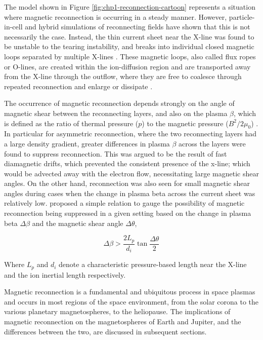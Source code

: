 The model shown in Figure \ref{fig:chp1-reconnection-cartoon} represents a situation where magnetic reconnection is occurring in a steady manner. However, particle-in-cell and hybrid simulations of reconnecting fields have shown that this is not necessarily the case. Instead, the thin current sheet near the X-line was found to be unstable to the tearing instability, and breaks into individual closed magnetic loops separated by multiple X-lines \cite{Drake2006ElectronReconnection,Drake2006FormationReconnection}. These magnetic loops, also called flux ropes or O-lines, are created within the ion-diffusion region and are transported away from the X-line through the outflow, where they are free to coalesce through repeated reconnection and enlarge or dissipate \cite{Markidis2012CollisionlessChain,Wang2016CoalescenceReconnection}. 

The occurrence of magnetic reconnection depends strongly on the angle of magnetic shear between the reconnecting layers, and also on the plasma $\beta$, which is defined as the ratio of thermal pressure ($p$) to the magnetic pressure ($B^2/2\mu_0$) \cite{Swisdak2003DiamagneticMagnetopause,Swisdak2010TheHeliosphere,Phan2010TheObservations}. In particular for asymmetric reconnection, where the two reconnecting layers had a large density gradient, greater differences in plasma $\beta$ across the layers were found to suppress reconnection. This was argued to be the result of fast diamagnetic drifts, which prevented the consistent presence of the x-line; which would be advected away with the electron flow, necessitating large magnetic shear angles. On the other hand, reconnection was also seen for small magnetic shear angles during cases when the change in plasma beta across the current sheet was relatively low.  proposed a simple relation to gauge the possibility of magnetic reconnection being suppressed in a given setting based on the change in plasma beta $\Delta \beta$ and the magnetic shear angle $\Delta \theta$,

\begin{equation}
    \Delta \beta > \frac{2 L_p}{d_i} \tan\frac{\Delta\theta}{2}
\end{equation}

Where $L_p$ and $d_i$ denote a characteristic pressure-based length near the X-line and the ion inertial length respectively. 

Magnetic reconnection is a fundamental and ubiquitous process in space plasmas and occurs in most regions of the space environment, from the solar corona to the various planetary magnetospheres, to the heliopause. The implications of magnetic reconnection on the magnetospheres of Earth and Jupiter, and the differences between the two, are discussed in subsequent sections.



